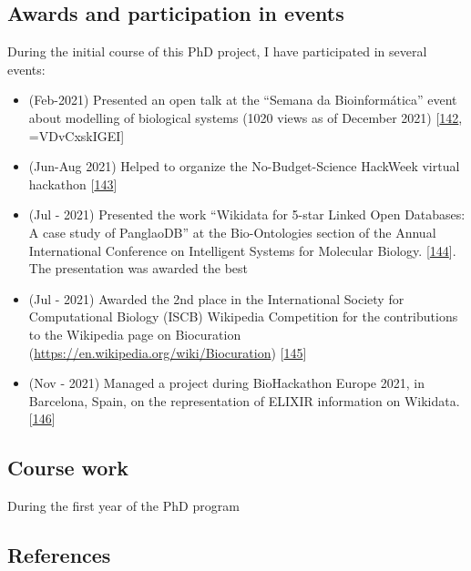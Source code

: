 \hypertarget{awards-and-participation-in-events}{%
\subsection{Awards and participation in events}\label{awards-and-participation-in-events}}

During the initial course of this PhD project, I have participated in several events:

\begin{itemize}
\tightlist
\item
  (Feb-2021) Presented an open talk at the ``Semana da Bioinformática'' event about modelling of biological systems (1020 views as of December 2021) {[}\protect\hyperlink{ref-1C9uHr1Zk}{142}, =VDvCxskIGEI{]}
\item
  (Jun-Aug 2021) Helped to organize the No-Budget-Science HackWeek virtual hackathon {[}\protect\hyperlink{ref-12LOzmXRs}{143}{]}
\item
  (Jul - 2021) Presented the work ``Wikidata for 5-star Linked Open Databases: A case study of PanglaoDB'' at the Bio-Ontologies section of the Annual International Conference on Intelligent Systems for Molecular Biology. {[}\protect\hyperlink{ref-SALI6Ywb}{144}{]}. The presentation was awarded the best
\item
  (Jul - 2021) Awarded the 2nd place in the International Society for Computational Biology (ISCB) Wikipedia Competition for the contributions to the Wikipedia page on Biocuration (\url{https://en.wikipedia.org/wiki/Biocuration}) {[}\protect\hyperlink{ref-IJG65hFm}{145}{]}
\item
  (Nov - 2021) Managed a project during BioHackathon Europe 2021, in Barcelona, Spain, on the representation of ELIXIR information on Wikidata. {[}\protect\hyperlink{ref-14Wi842eZ}{146}{]}
\end{itemize}

\hypertarget{course-work}{%
\subsection{Course work}\label{course-work}}

During the first year of the PhD program

\hypertarget{references}{%
\subsection{References}\label{references}}

